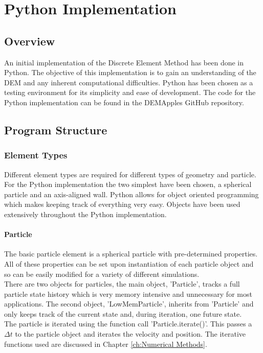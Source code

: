 \documentclass[10pt,a4paper,titlepage]{report}
\begin{document}
\chapter{Python Implementation}
\label{ch:Python Implementation}
\section{Overview}
An initial implementation of the Discrete Element Method has been done in Python. The objective of this implementation is to gain an understanding of the DEM and any inherent computational difficulties. Python has been chosen as a testing environment for its simplicity and ease of development. The code for the Python implementation can be found in the DEMApples GitHub repository\cite{DEMApples}.
\section{Program Structure}
\subsection{Element Types}
Different element types are required for different types of geometry and particle. For the Python implementation the two simplest have been chosen, a spherical particle and an axis-aligned wall. Python allows for object oriented programming which makes keeping track of everything very easy. Objects have been used extensively throughout the Python implementation.
\subsubsection{Particle}
The basic particle element is a spherical particle with pre-determined properties. All of these properties can be set upon instantiation of each particle object and so can be easily modified for a variety of different simulations.
\\There are two objects for particles, the main object, 'Particle', tracks a full particle state history which is very memory intensive and unnecessary for most applications. The second object, 'LowMemParticle', inherits from 'Particle' and only keeps track of the current state and, during iteration, one future state.
\\The particle is iterated using the function call 'Particle.iterate()'. This passes a $\Delta t$ to the particle object and iterates the velocity and position. The iterative functions used are discussed in Chapter \ref{ch:Numerical Methods}.
\end{document}
